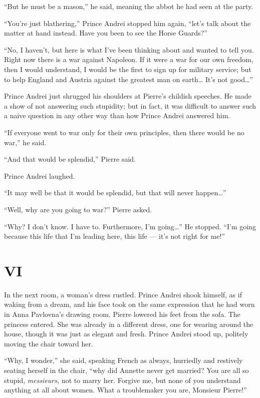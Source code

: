 ``But he must be a mason,'' he said, meaning the abbot he had seen at the party. %

``You're just blathering,'' Prince Andrei stopped him again, ``let's talk about the matter at hand instead. Have you been to see the Horse Guards?'' %

``No, I haven't, but here is what I've been thinking about and wanted to tell you. Right now there is a war against Napoleon. If it were a war for our own freedom, then I would understand, I would be the first to sign up for military service; but to help England and Austria against the greatest man on earth\ldots{} It's not good\ldots{}'' %

Prince Andrei just shrugged his shoulders at Pierre's childish speeches. He made a show of not answering such stupidity; but in fact, it was difficult to answer such a naive question in any other way than how Prince Andrei answered him.

``If everyone went to war only for their own principles, then there would be no war,'' he said. %

``And that would be splendid,'' Pierre said. %

Prince Andrei laughed.

``It may well be that it would be splendid, but that will never happen\ldots{}'' %

``Well, why are you going to war?'' Pierre asked. %

``Why? I don't know. I have to. Furthermore, I'm going\ldots{}'' He stopped. ``I'm going because this life that I'm leading here, this life --- it's not right for me!'' %

\section*{VI} %

In the next room, a woman's dress rustled. Prince Andrei shook himself, as if waking from a dream, and his face took on the same expression that he had worn in Anna Pavlovna's drawing room. Pierre lowered his feet from the sofa. The princess entered. She was already in a different dress, one for wearing around the house, though it was just as elegant and fresh. Prince Andrei stood up, politely moving the chair toward her.

``Why, I wonder,'' she said, speaking French as always, hurriedly and restively seating herself in the chair, ``why did Annette never get married? You are all so stupid, \textit{messieurs,} not to marry her. Forgive me, but none of you understand anything at all about women. What a troublemaker you are, Monsieur Pierre!'' %

